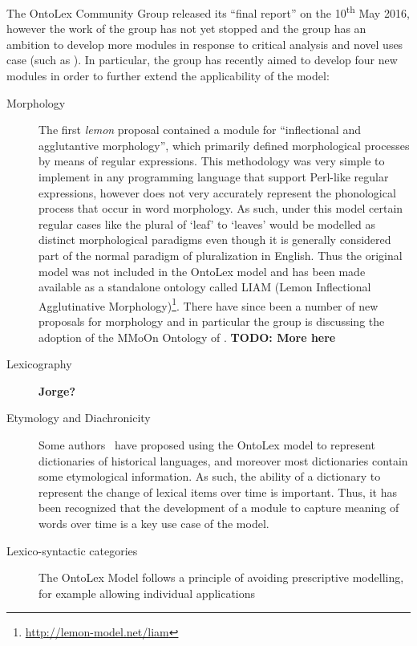 \documentclass[12pt,a4paper]{elex2017}
\begin{document}
The OntoLex Community Group released its ``final report'' on the
10\textsuperscript{th} May 2016,
however the work of the group has not yet stopped and the group has an ambition
to develop more modules in response to critical analysis and novel uses case
(such as \cite{chavula2014lemon}). In particular, the group has recently aimed
to develop four new modules in order to further extend the applicability of the
model:

\begin{description}
    \item[Morphology] The first \emph{lemon} proposal contained a module for
        ``inflectional and agglutantive morphology'', which primarily defined
        morphological processes by means of regular expressions. This
        methodology was very simple to implement in any programming language
        that support Perl-like regular expressions, however does not very
        accurately represent the phonological process that occur in word
        morphology. As such, under this model certain regular cases like the
        plural of `leaf' to `leaves' would be modelled as distinct morphological
        paradigms even though it is generally considered part of the normal paradigm of
        pluralization in English. Thus the original model was not included in
        the OntoLex model and has been made available as
        a standalone ontology called LIAM (Lemon Inflectional Agglutinative
        Morphology)\footnote{\url{http://lemon-model.net/liam}}. There have
        since been a number of new proposals for morphology and in particular
        the group is discussing the adoption of the MMoOn Ontology of
        \citep{MMoOn_heb}. \textbf{TODO: More here}
    \item[Lexicography] \textbf{Jorge?}
    \item[Etymology and Diachronicity] Some authors~\citep{khan2014using,abromeit2016linking} have
        proposed using the OntoLex model to represent dictionaries of historical
        languages, and moreover most dictionaries contain some etymological
        information. As such, the ability of a dictionary to represent the
        change of lexical items over time is important. Thus, it has been
        recognized that the development of a module to capture meaning of words
        over time is a key use case of the model.
    \item[Lexico-syntactic categories] The OntoLex Model follows a principle of
        avoiding prescriptive modelling, for example allowing individual
        applications

\end{description}
\end{document}
